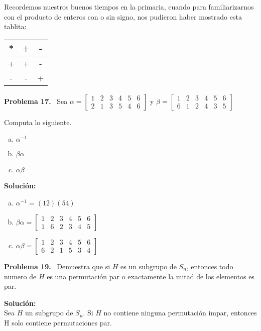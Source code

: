 \documentclass{article}
\newcounter{problem}
\newcounter{solution}
\newcommand\Problem[1]{%
  \stepcounter{problem}%
  \textbf{Problema #1.}~%
  \setcounter{solution}{0}%
}
\newcommand\TheSolution{%
  \textbf{Solución:}\\%
}
\begin{document}
Recordemos nuestros buenos tiempos en la primaria, cuando para familiarizarnos
con el producto de enteros con o sin signo, nos pudieron haber mostrado esta
tablita:

\begin{table}[htbp]
\begin{center}
\begin{tabular}{c|cc}
* & + & - \\ \hline
+ & +  & -\\
- & - & + \\
\end{tabular}
\end{center}
\end{table}

\Problem{17} Sea 
$\alpha = \begin{bmatrix}
  1 & 2 & 3 & 4 & 5 & 6 \\
	2 & 1 & 3 & 5 & 4 & 6
\end{bmatrix}$ y 
$\beta = \begin{bmatrix}
  1 & 2 & 3 & 4 & 5 & 6 \\
  6 & 1 & 2 & 4 & 3 & 5
\end{bmatrix}$

Computa lo siguiente.
\begin{enumerate}[a.]
  \item $\alpha^{-1}$
  \item $\beta \alpha$
  \item $\alpha \beta$
\end{enumerate}

\TheSolution{}
\begin{enumerate}[a.]
  \item $\alpha^{-1} = (12)(54)$
  \item $\beta\alpha = 
    \begin{bmatrix}
      1 & 2 & 3 & 4 & 5 & 6 \\
			1 & 6 & 2 & 3 & 4 & 5
    \end{bmatrix}$
  \item $\alpha\beta = 
    \begin{bmatrix}
      1 & 2 & 3 & 4 & 5 & 6 \\
			6 & 2 & 1 & 5 & 3 & 4
    \end{bmatrix}$
\end{enumerate} 
\Problem{19} Demuestra que si $H$ es un subgrupo de $S_n$, entonces todo
numero de $H$ es una permutación par o exactamente la mitad de los elementos
es par.

\TheSolution{}
Sea $H$ un subgrupo de $S_n$. Si $H$ no contiene ninguna permutaci\'on impar,
entonces H solo contiene permutaciones par.
\end{document}

